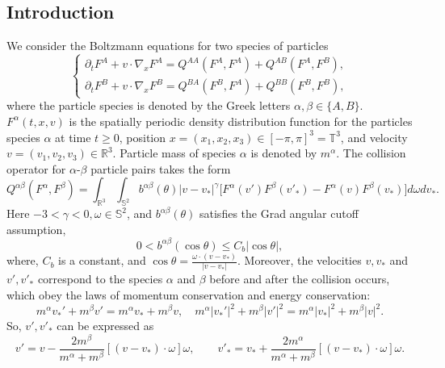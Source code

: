 \documentclass[reqno]{amsart}
\numberwithin{equation}{section}
\numberwithin{equation}{section}
\begin{document}
	\subsection{Introduction}
	We consider the Boltzmann equations for two species of particles
	\begin{equation}\label{MAMAMAMAzhuyaotuimox}
		\left\{
		\begin{gathered}
			\partial_tF^A+v\cdot \nabla_xF^A=Q^{AA}(F^A,F^A)+Q^{AB}(F^A,F^B),
			\\
			\partial_tF^B+v\cdot \nabla_xF^B=Q^{BA}(F^B,F^A)+Q^{BB}(F^B,F^B),
		\end{gathered}
		\right.
	\end{equation}
	where the particle species is denoted by the Greek letters $\alpha,\beta\in\{A,B\}$. $F^\alpha(t,x,v)$ is the spatially periodic density distribution function for the particles species $\alpha$ at time $t\geq0$, position $x=(x_1,x_2,x_3)\in [-\pi,\pi]^3=\mathbb{T}^3$, and velocity $v=(v_1,v_2,v_3)\in \mathbb{R}^3$. Particle mass of species $\alpha$ is denoted by $m^\alpha$.  
	The collision operator  for $\alpha$-$\beta$ particle pairs takes the form
	$$ Q^{\alpha \beta}(F^{\alpha},F^{\beta})=\int_{\mathbb{R}^3}\int_{\mathbb{S}^2}b^{\alpha \beta}(\theta) |v-v_*|^{\gamma} \Big[F^{\alpha}(v') F^{\beta}(v'_*)-F^{\alpha}(v)F^{\beta}(v_*) \Big] d\omega dv_*. $$
	Here $-3<\gamma<0, \omega\in\mathbb{S}^2$, and $b^{\alpha \beta}(\theta)$ satisfies the Grad angular cutoff assumption,
	\begin{equation*}
		0< b^{\alpha \beta}(\cos \theta)\leq C_{b}  |\cos \theta |,
	\end{equation*}
	where, $C_{b}$ is a constant, and $\cos\theta=\frac{\omega\cdot(v-v_*)}{|v-v_*|}$. Moreover, the velocities $v, v_*$
	and $v', v'_*$ correspond to the species $\alpha$ and $\beta$ before and after the collision occurs, which obey the laws of momentum conservation and energy conservation:
	\begin{equation*}
		m^{\alpha} v_*' +m^{\beta}v' =m^{\alpha} v_*+m^{\beta} v, \quad
		m^{\alpha}|v_*'|^{2}+m^{\beta}|v'|^2 =m^{\alpha}|v_*|^2+m^{\beta}|v|^2.
	\end{equation*}
	So, $ v', v'_* $ can be expressed as	
	\begin{equation}\label{F1vuvusacl}
			v'=v-\frac{2m^{\beta}}{m^\alpha+m^\beta}[(v-v_*)\cdot \omega]\omega,\qquad 
			v'_{*}=v_{*}+\frac{2m^{\alpha}}{m^\alpha+m^\beta}[(v-v_*)\cdot \omega]\omega.
	\end{equation}
\end{document}
